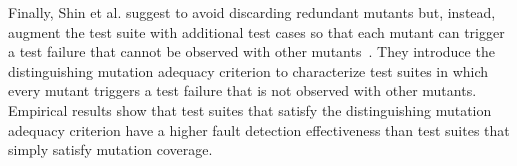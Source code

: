 Finally, Shin et al. suggest to avoid discarding redundant mutants but, instead, augment the test suite with additional test cases so that 
each mutant can trigger a test failure that cannot be observed with other mutants~\cite{Shin:TSE:DCriterion:2018}. 
They introduce the distinguishing mutation adequacy criterion to characterize test suites in which every mutant triggers a test failure that is not observed with other mutants.
Empirical results show that test suites that satisfy the distinguishing mutation adequacy criterion have a higher
 fault detection effectiveness than test suites that simply satisfy mutation coverage.



